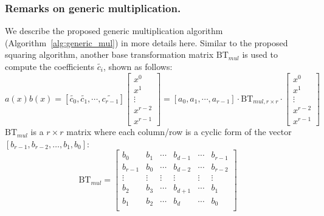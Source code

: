 \documentclass[runningheads]{llncs}
\begin{document}
\subsubsection{Remarks on generic multiplication.}
We describe the proposed generic multiplication algorithm (Algorithm~\ref{alg:generic_mul}) in more details here. Similar to the proposed squaring algorithm,
another base transformation matrix $\text{BT}_{mul}$ is used to compute the coefficients $\widetilde{c_{i}}$, shown as follows:
\[
a(x)b(x)= [\widetilde{c_{0}},\widetilde{c_{1}},\cdots,\widetilde{c_{r-1}}]\left[ \begin{array}{c}
x^{0} \\
x^{1} \\
\vdots\\
x^{r-2}\\
x^{r-1}
\end{array}
\right ]
=
[{a_{0}},{a_{1}},\cdots,{a_{r-1}}]
\cdot \text{BT}_{mul,r\times r} \cdot
\left[ \begin{array}{c}
x^{0} \\
x^{1} \\
\vdots\\
x^{r-2}\\
x^{r-1}
\end{array}
\right ]
\]
$\text{BT}_{mul}$ is a $r\times r$ matrix where each column/row is a cyclic form of the vector $[b_{r-1},b_{r-2},\ldots, b_{1},b_{0}]$:
\[
\text{BT}_{mul} =
\left[ \begin{array}{cccccc}
b_{0}&b_{1}&\cdots&b_{d-1}&\cdots &b_{r-1} \\
b_{r-1}&b_{0}&\cdots&b_{d-2}&\cdots &b_{r-2} \\
\vdots&\vdots&\vdots&\vdots&\vdots&\vdots\\
b_{2}&b_{3}&\cdots&b_{d+1}&\cdots &b_{1} \\
b_{1}&b_{2}&\cdots&b_{d}&\cdots &b_{0} \\
\end{array}
\right ]
\]
\end{document}
